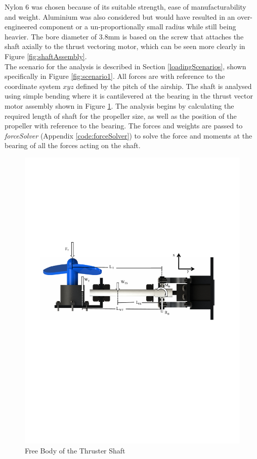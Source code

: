 \documentclass[../main.tex]{subfiles}
\begin{document}
Nylon 6 was chosen because of its suitable strength, ease of manufacturability and weight. Aluminium was also considered but would have resulted in an over-engineered component or a un-proportionally small radius while still being heavier. The bore diameter of 3.8mm is based on the screw that attaches the shaft axially to the thrust vectoring motor, which can be seen more clearly in Figure \ref{fig:shaftAssembly}.\\

The scenario for the analysis is described in Section \ref{loadingScenarios}, shown specifically in Figure \ref{fig:scenario1}. All forces are with reference to the coordinate system $xyz$ defined by the pitch of the airship. The shaft is analysed using simple bending where it is cantilevered at the bearing in the thrust vector motor assembly shown in Figure \ref{fig:thrusterShaftFBD}. The analysis begins by calculating the required length of shaft for the propeller size, as well as the position of the propeller with reference to the bearing. The forces and weights are passed to \textit{forceSolver} (Appendix \ref{code:forceSolver}) to solve the force and moments at the bearing of all the forces acting on the shaft.

\begin{figure}[H]
	\centering
	\includegraphics[width=.9\linewidth]{img/analysis/thruster/thrusterShaft.pdf}
	\caption{Free Body of the Thruster Shaft}
	\label{fig:thrusterShaftFBD}
\end{figure}
\end{document}
